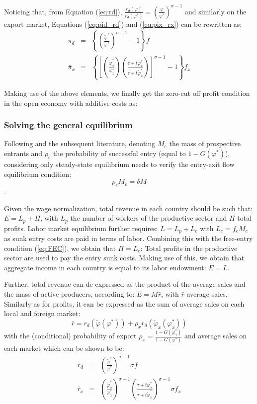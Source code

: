 \documentclass[a4paper,11pt]{article}
\begin{document}
Noticing that, from Equation (\ref{eq:rd}), $\frac{r_d(\varphi)}{r_d(\varphi^\ast)} = \left( \frac{\varphi}{\varphi^\ast} \right)^{\sigma-1}$ and similarly on the export market, Equations (\ref{eq:pid_rd}) and (\ref{eq:pix_rx}) can be rewritten as:
\begin{eqnarray*}
\bar{\pi}_d &=& \left\{\left(\frac{\widetilde{\varphi}^\ast}{\varphi^\ast}\right)^{\sigma-1}-1 \right\}f \\
\bar{\pi}_x &=& \left\{\left[\left(\frac{\widetilde{\varphi}_x^\ast}{\varphi_x^\ast}\right)\left(\frac{\tau+ t \varphi^\ast_x}{\tau+ t \widetilde{\varphi}^\ast_x}\right)\right]^{\sigma-1}-1 \right\}f_x
\end{eqnarray*}

Making use of the above elements, we finally get the zero-cut off profit condition in the open economy with additive costs as:


\subsubsection{Solving the general equilibrium}

Following \cite{melitz} and the subsequent literature, denoting $M_e$ the mass of prospective entrants and $\rho_e$ the probability of successful entry (equal to $1-G(\varphi^\ast)$), considering only steady-state equilibrium needs to verify the entry-exit flow equilibrium condition:
$$\rho_e M_e = \delta M$$.

Given the wage normalization, total revenue in each country should be such that: $E = L_p+\Pi$, with $L_p$ the number of workers of the productive sector and $\Pi$ total profits. Labor market equilibrium further requires: $L = L_p+ L_e$ with $L_e = f_eM_e$ as sunk entry costs are paid in terms of labor. Combining this with the free-entry condition (\ref{eq:FEC}), we obtain that $\Pi = L_e$: Total profits in the productive sector are used to pay the entry sunk costs. Making use of this, we obtain that aggregate income in each country is equal to its labor endowment: $E =L$.

Further, total revenue can de expressed as the product of the average sales and the mass of active producers, according to: $E = M\bar{r}$, with $\bar{r}$ average sales. Similarly as for profits, it can be expressed as the sum of average sales on each local and foreign market:
$$\bar{r} = r_d(\widetilde{\varphi}(\varphi^\ast))+ \rho_x r_d(\widetilde{\varphi}_x(\varphi_x^\ast))$$
\noindent with the (conditional) probability of export $\rho_x = \frac{1-G(\varphi^\ast_x)}{1-G(\varphi^\ast)}$ and average sales on each market which can be shown to be:
\begin{eqnarray*}
\bar{r}_d &=& \left(\frac{\widetilde{\varphi}^\ast}{\varphi^\ast}\right)^{\sigma-1} \sigma f \\
\bar{r}_x &=& \left(\frac{\widetilde{\varphi}_x^\ast}{\varphi_x^\ast}\right)^{\sigma-1}\left(\frac{\tau+ t \varphi^\ast_x}{\tau+ t \widetilde{\varphi}^\ast_x}\right)^{\sigma-1} \sigma f_x
\end{eqnarray*}
\end{document}
